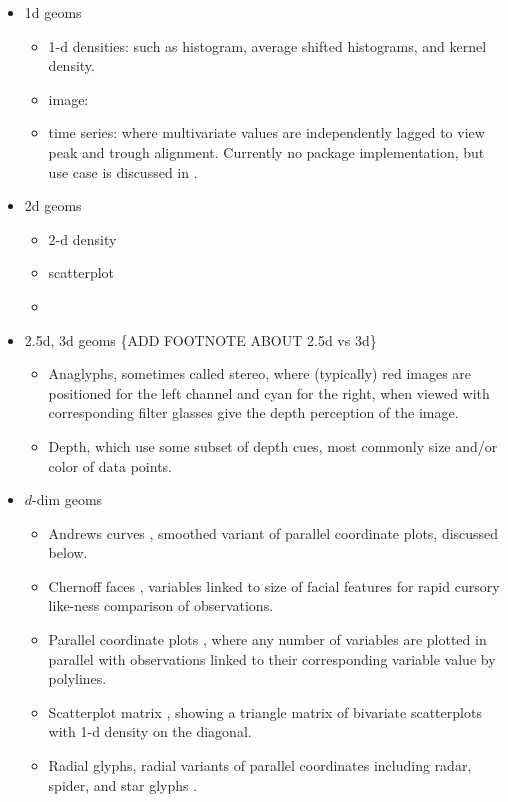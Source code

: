 \documentclass{monashthesis}
\begin{document}
\begin{itemize}
\tightlist
\item
  1d geoms

  \begin{itemize}
  \tightlist
  \item
    1-d densities: such as histogram, average shifted
    histograms\autocite{scott85}, and kernel density\autocite{scott95}.
  \item
    image: \autocite[ 2001]{Wegman}
  \item
    time series: where multivariate values are independently lagged to
    view peak and trough alignment. Currently no package implementation,
    but use case is discussed in \autocite{cook_manual_1997}.
  \end{itemize}
\item
  2d geoms

  \begin{itemize}
  \item
    2-d density \autocite[ GITHUB]{NS}
  \item
    scatterplot
  \item
  \end{itemize}
\item
  2.5d, 3d geoms \{ADD FOOTNOTE ABOUT 2.5d vs 3d\}

  \begin{itemize}
  \tightlist
  \item
    Anaglyphs, sometimes called stereo, where (typically) red images are
    positioned for the left channel and cyan for the right, when viewed
    with corresponding filter glasses give the depth perception of the
    image.
  \item
    Depth, which use some subset of depth cues, most commonly size
    and/or color of data points.
  \end{itemize}
\item
  \(d\)-dim geoms

  \begin{itemize}
  \tightlist
  \item
    Andrews curves \autocite{andrews_plots_1972}, smoothed variant of
    parallel coordinate plots, discussed below.
  \item
    Chernoff faces \autocite{chernoff_use_1973}, variables linked to
    size of facial features for rapid cursory like-ness comparison of
    observations.
  \item
    Parallel coordinate plots \autocite{ocagne_coordonnees_1885}, where
    any number of variables are plotted in parallel with observations
    linked to their corresponding variable value by polylines.
  \item
    Scatterplot matrix \autocite{becker_brushing_1987}, showing a
    triangle matrix of bivariate scatterplots with 1-d density on the
    diagonal.
  \item
    Radial glyphs, radial variants of parallel coordinates including
    radar, spider, and star glyphs \autocite{siegel_surgical_1972}.
  \end{itemize}
\end{itemize}
\end{document}
